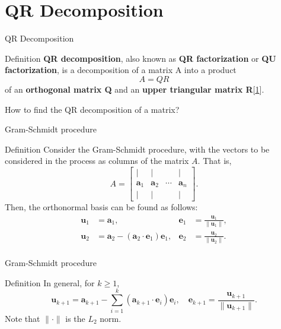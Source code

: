 \documentclass{beamer}
\begin{document}
\section{QR Decomposition}
\begin{frame}[label=3]{QR Decomposition}
    \begin{block}{Definition}
        \textbf{QR decomposition}, also known as \textbf{QR factorization} or \textbf{QU factorization}, is a decomposition of a matrix A into a product 
        \begin{equation*}
            A=QR
        \end{equation*} of an \textbf{orthogonal matrix Q} and an \textbf{upper triangular matrix R}[\href{https://en.wikipedia.org/wiki/QR_decomposition}{1}].
    \end{block}

    \pause
    How to find the QR decomposition of a matrix?
\end{frame}    
    
\begin{frame}{Gram-Schmidt procedure}
    \begin{block}{Definition}
            Consider the Gram-Schmidt procedure, with the vectors to be considered in the process as
    columns of the matrix \(A\). That is,
    \[
    A = \begin{bmatrix}
    \vert & \vert & & \vert \\
    \mathbf{a}_1 & \mathbf{a}_2 & \cdots & \mathbf{a}_n \\
    \vert & \vert & & \vert
    \end{bmatrix}.
    \]
    Then, the orthonormal basis can be found as follows:
    \begin{align*}
    \mathbf{u}_1 &= \mathbf{a}_1, & \mathbf{e}_1 &= \frac{\mathbf{u}_1}{\|\mathbf{u}_1\|}, \\
    \mathbf{u}_2 &= \mathbf{a}_2 - (\mathbf{a}_2 \cdot \mathbf{e}_1)\mathbf{e}_1, & \mathbf{e}_2 &= \frac{\mathbf{u}_2}{\|\mathbf{u}_2\|}. \\
    \end{align*}
    \end{block}
\end{frame}
\begin{frame}{Gram-Schmidt procedure}
    \begin{block}{Definition}
        In general, for \(k \geq 1\),
\[
\mathbf{u}_{k+1} = \mathbf{a}_{k+1} - \sum_{i=1}^k (\mathbf{a}_{k+1} \cdot \mathbf{e}_i)\mathbf{e}_i, \quad \mathbf{e}_{k+1} = \frac{\mathbf{u}_{k+1}}{\|\mathbf{u}_{k+1}\|}.
\]
Note that \(\| \cdot \|\) is the \(L_2\) norm.
    \end{block}
\end{frame}
\end{document}
